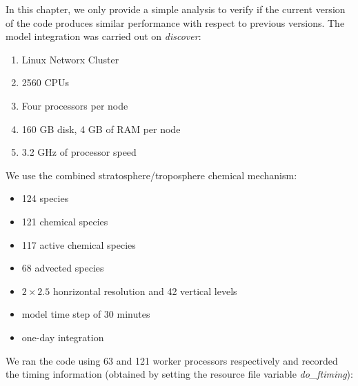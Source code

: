 In this chapter, we only provide a simple analysis to verify if the
current version of the code produces similar performance with respect
to previous versions.
The model integration was carried out on {\em discover}:
%
\begin{enumerate}
\item Linux Networx Cluster
\item 2560 CPUs
\item Four processors per node
\item 160 GB disk, 4 GB of RAM per node
\item 3.2 GHz of processor speed
\end{enumerate}
%
We use the combined stratosphere/troposphere chemical mechanism:
\begin{itemize}
\item 124 species
\item 121 chemical species
\item 117 active chemical species
\item 68 advected species
\item $2 \times 2.5$ honrizontal resolution and 42 vertical levels
\item model time step of 30 minutes
\item one-day integration
\end{itemize}
%
We ran the code using 63 and 121 worker processors respectively and 
recorded the timing information (obtained by setting the resource file 
variable {\em do\_ftiming}):
%
